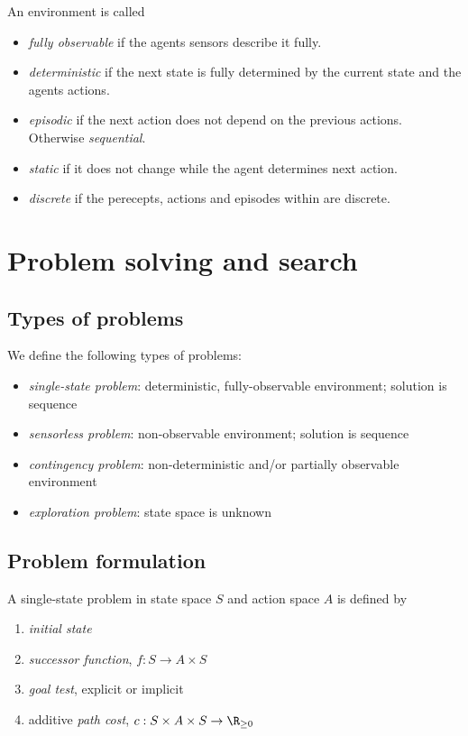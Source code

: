 \documentclass{article}
\begin{document}
\begin{definition}
    An environment is called
    \begin{itemize}
        \item \emph{fully observable} if the agents sensors describe it fully.
        \item \emph{deterministic} if the next state is fully
        determined by the current state and the agents actions.
        \item \emph{episodic} if the next action does not depend on the previous
        actions. Otherwise \emph{sequential}.
        \item \emph{static} if it does not change while the agent determines
        next action.
        \item \emph{discrete} if the perecepts, actions and episodes within
        are discrete.
    \end{itemize}
\end{definition}

\section{Problem solving and search}


\subsection{Types of problems}

\begin{definition}
    We define the following types of problems:
    \begin{itemize}
        \item \emph{single-state problem}: deterministic, fully-observable environment; solution is sequence
        \item \emph{sensorless problem}: non-observable environment; solution is sequence
        \item \emph{contingency problem}: non-deterministic and/or partially observable environment
        \item \emph{exploration problem}: state space is unknown
    \end{itemize}
\end{definition}

\subsection{Problem formulation}

\begin{definition}
    A single-state problem in state space $S$
    and action space $A$ is defined by
    \begin{enumerate}
        \item \emph{initial state}
        \item \emph{successor function}, $f:S\to A\times S$
        \item \emph{goal test}, explicit or implicit
        \item additive \emph{path cost}, $c:S\times A\times S\to\R_{\geq 0}$
    \end{enumerate}
\end{definition}
\end{document}
